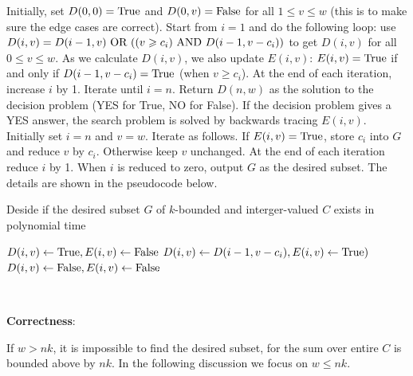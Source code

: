 \documentclass{article}
\begin{document}
Initially, set $D(0,0)=\textup{True}$ and $D(0,v)=\textup{False}$ for all $1\leqslant v\leqslant w$ (this is to make sure the edge cases are correct). Start from $i=1$ and do the following loop: use $D(i,v)=D(i-1,v)\textup{ OR }((v\geqslant c_i)\textup{ AND }D(i-1,v-c_i))$ to get $D(i,v)$ for all $0\leqslant v\leqslant w$. As we calculate $D(i,v)$, we also update $E(i,v)$: $E(i,v)=\textup{True}$ if and only if $D(i-1,v-c_i)=\textup{True}$ (when $v\geqslant c_i$). At the end of each iteration, increase $i$ by 1. Iterate until $i=n$. Return $D(n,w)$ as the solution to the decision problem (YES for True, NO for False). If the decision problem gives a YES answer, the search problem is solved by backwards tracing $E(i,v)$. Initially set $i=n$ and $v=w$. Iterate as follows. If $E(i,v)=\textup{True}$, store $c_i$ into $G$ and reduce $v$ by $c_i$. Otherwise keep $v$ unchanged. At the end of each iteration reduce $i$ by 1. When $i$ is reduced to zero, output $G$ as the desired subset. The details are shown in the pseudocode below.
\begin{algorithm}
\caption{Deside if the desired subset $G$ of $k$-bounded and interger-valued $C$ exists in polynomial time}
\begin{algorithmic}[1]
 
\Else{}
	\EndFor
			 {$D(i,v)\gets\textup{True},E(i,v)\gets\textup{False}$}
			 {$D(i,v)\gets D(i-1,v-c_i),E(i,v)\gets\textup{True})$}
			\Else{} {$D(i,v)\gets\textup{False},E(i,v)\gets\textup{False}$}
			\EndIf
		\EndFor
	\EndFor
	\State{}
\EndIf
\EndProcedure

\Else{}
		\EndIf
	\EndFor
\EndIf
\EndProcedure
\end{algorithmic}
\end{algorithm}

~

\noindent\textbf{Correctness}:

If $w>nk$, it is impossible to find the desired subset, for the sum over entire $C$ is bounded above by $nk$. In the following discussion we focus on $w\leqslant nk$.
\end{document}
